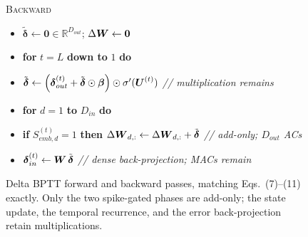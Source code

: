 \documentclass[10pt,journal,compsoc]{IEEEtran}
\begin{document}
\begin{figure}[t!]
\begin{center}
{\begin{minipage}{0.97\linewidth}
\noindent\textsc{Backward}
\begin{itemize}\setlength{\itemsep}{0pt}\setlength{\leftmargin}{1.6em}
\item[] $\tilde{\bm{\delta}} \gets \bm{0} \in \mathbb{R}^{D_{out}}$;\; $\Delta\boldsymbol{W} \gets \boldsymbol{0}$
\item[] \textbf{for} $t = L$ \textbf{down to} $1$ \textbf{do}
\item[] \hspace{1.2em} $\tilde{\boldsymbol{\delta}} \gets \left( \boldsymbol{\delta}_{out}^{(t)} + \tilde{\boldsymbol{\delta}} \odot \boldsymbol{\beta} \right) \odot \sigma'(\boldsymbol{U}^{(t)})$ \hfill\emph{// multiplication remains}
\item[] \hspace{1.2em} \textbf{for} $d = 1$ \textbf{to} $D_{in}$ \textbf{do}
\item[] \hspace{2.4em} \textbf{if} $S_{emb,d}^{(t)} = 1$ \textbf{then} $\Delta\boldsymbol{W}_{d,:} \gets \Delta\boldsymbol{W}_{d,:} + \tilde{\boldsymbol{\delta}}$ \hfill\emph{// add-only; $D_{out}$ ACs}
\item[] \hspace{1.2em} $\boldsymbol{\delta}_{in}^{(t)} \gets \boldsymbol{W} \, \tilde{\boldsymbol{\delta}}$ \hfill\emph{// dense back-projection; MACs remain}
\end{itemize}
\end{minipage}}
\end{center}
\caption{Delta BPTT forward and backward passes, matching Eqs.~(7)--(11) exactly. Only the two spike-gated phases are add-only; the state update, the temporal recurrence, and the error back-projection retain multiplications.}
\label{alg:delta_bptt}
\end{figure}
\end{document}
